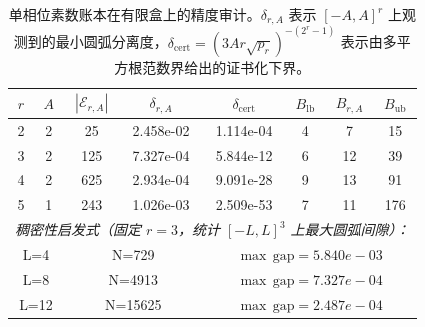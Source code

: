 \begin{table}[H]
\centering
\scriptsize
\setlength{\tabcolsep}{5pt}
\caption{单相位素数账本在有限盒上的精度审计。$\delta_{r,A}$ 表示 $[-A,A]^r$ 上观测到的最小圆弧分离度，$\delta_{\mathrm{cert}}=(3Ar\sqrt{p_r})^{-(2^r-1)}$ 表示由多平方根范数界给出的证书化下界。}
\label{tab:conclusion_singlephase_prime_ledger_precision_audit}
\begin{tabular}{c c c c c c c c}
\toprule
$r$ & $A$ & $|\mathcal E_{r,A}|$ & $\delta_{r,A}$ & $\delta_{\mathrm{cert}}$ & $B_{\mathrm{lb}}$ & $B_{r,A}$ & $B_{\mathrm{ub}}$\\
\midrule
2 & 2 & 25 & 2.458e-02 & 1.114e-04 & 4 & 7 & 15\\
3 & 2 & 125 & 7.327e-04 & 5.844e-12 & 6 & 12 & 39\\
4 & 2 & 625 & 2.934e-04 & 9.091e-28 & 9 & 13 & 91\\
5 & 1 & 243 & 1.026e-03 & 2.509e-53 & 7 & 11 & 176\\
\midrule
\multicolumn{8}{c}{\textit{稠密性启发式（固定 $r=3$，统计 $[-L,L]^3$ 上最大圆弧间隙）：}}\\
\multicolumn{2}{c}{L=4} & \multicolumn{2}{c}{N=729} & \multicolumn{4}{c}{$\max\,\mathrm{gap}=5.840e-03$}\\
\multicolumn{2}{c}{L=8} & \multicolumn{2}{c}{N=4913} & \multicolumn{4}{c}{$\max\,\mathrm{gap}=7.327e-04$}\\
\multicolumn{2}{c}{L=12} & \multicolumn{2}{c}{N=15625} & \multicolumn{4}{c}{$\max\,\mathrm{gap}=2.487e-04$}\\
\bottomrule
\end{tabular}
\end{table}
